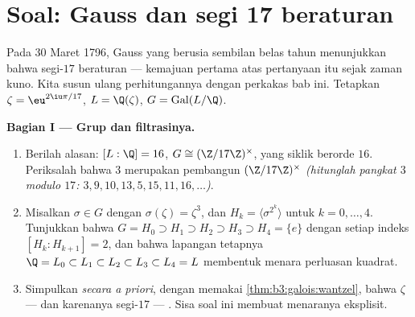 \section{Soal: Gauss dan segi 17 beraturan}

\begin{problem}\label{pb:b3:galois:1}
Pada 30 Maret 1796, Gauss yang berusia sembilan belas tahun menunjukkan bahwa
segi-$17$ beraturan  --- kemajuan pertama atas
pertanyaan itu sejak zaman kuno. Kita susun ulang perhitungannya dengan
perkakas bab ini. Tetapkan $\zeta = \eu^{2\iu\pi/17}$, $L =
\Q(\zeta)$, $G = \operatorname{Gal}(L/\Q)$.

\medskip
\noindent\textbf{Bagian I --- Grup dan filtrasinya.}
\begin{enumerate}
  \item Berilah alasan: $[L:\Q] = 16$, $G \cong (\Z/17\Z)^\times$,
        yang siklik berorde $16$. Periksalah bahwa $3$ merupakan pembangun
        $(\Z/17\Z)^\times$ \emph{(hitunglah pangkat $3$
        modulo $17$: $3, 9, 10, 13, 5, 15, 11, 16, \dots$)}.
  \item Misalkan $\sigma \in G$ dengan $\sigma(\zeta) = \zeta^3$, dan
        $H_k = \langle \sigma^{2^k}\rangle$ untuk $k = 0, \dots,
        4$. Tunjukkan bahwa $G = H_0 \supset H_1 \supset H_2 \supset
        H_3 \supset H_4 = \{e\}$ dengan setiap indeks $[H_k :
        H_{k+1}] = 2$, dan bahwa lapangan tetapnya $\Q = L_0
        \subset L_1 \subset L_2 \subset L_3 \subset L_4 = L$
        membentuk menara perluasan kuadrat.
  \item Simpulkan \emph{secara a priori}, dengan memakai
        \cref{thm:b3:galois:wantzel}, bahwa $\zeta$ --- dan karenanya
        segi-$17$ --- . Sisa soal ini
        membuat menaranya eksplisit.
\end{enumerate}


\end{problem}
